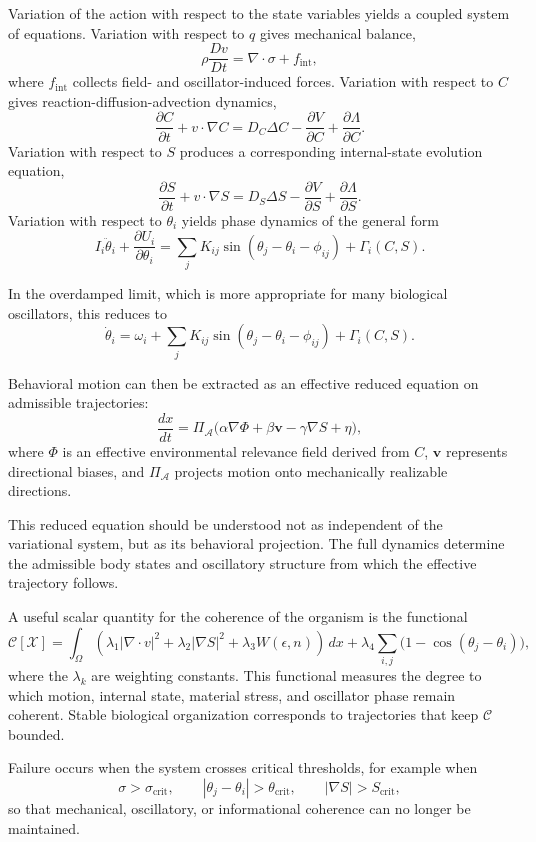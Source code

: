 \documentclass[11pt,oneside]{book}
\begin{document}
Variation of the action with respect to the state variables yields a coupled system of equations. Variation with respect to $q$ gives mechanical balance,
\[
\rho \frac{D v}{D t} = \nabla \cdot \sigma + f_{\mathrm{int}},
\]
where $f_{\mathrm{int}}$ collects field- and oscillator-induced forces. Variation with respect to $C$ gives reaction-diffusion-advection dynamics,
\[
\frac{\partial C}{\partial t}
+
v \cdot \nabla C
=
D_C \Delta C - \frac{\partial V}{\partial C} + \frac{\partial \Lambda}{\partial C}.
\]
Variation with respect to $S$ produces a corresponding internal-state evolution equation,
\[
\frac{\partial S}{\partial t}
+
v \cdot \nabla S
=
D_S \Delta S - \frac{\partial V}{\partial S} + \frac{\partial \Lambda}{\partial S}.
\]
Variation with respect to $\theta_i$ yields phase dynamics of the general form
\[
I_i \ddot{\theta}_i
+
\frac{\partial U_i}{\partial \theta_i}
=
\sum_j
K_{ij}\sin(\theta_j-\theta_i-\phi_{ij})
+
\Gamma_i(C,S).
\]

In the overdamped limit, which is more appropriate for many biological oscillators, this reduces to
\[
\dot{\theta}_i
=
\omega_i
+
\sum_j
K_{ij}\sin(\theta_j-\theta_i-\phi_{ij})
+
\Gamma_i(C,S).
\]

Behavioral motion can then be extracted as an effective reduced equation on admissible trajectories:
\[
\frac{dx}{dt}
=
\Pi_{\mathcal{A}}
\big(
\alpha \nabla \Phi
+
\beta \mathbf{v}
-
\gamma \nabla S
+
\eta
\big),
\]
where $\Phi$ is an effective environmental relevance field derived from $C$, $\mathbf{v}$ represents directional biases, and $\Pi_{\mathcal{A}}$ projects motion onto mechanically realizable directions.

This reduced equation should be understood not as independent of the variational system, but as its behavioral projection. The full dynamics determine the admissible body states and oscillatory structure from which the effective trajectory follows.

A useful scalar quantity for the coherence of the organism is the functional
\[
\mathcal{C}[\mathcal{X}]
=
\int_\Omega
\left(
\lambda_1 |\nabla \cdot v|^2
+
\lambda_2 |\nabla S|^2
+
\lambda_3 W(\epsilon,n)
\right)\,dx
+
\lambda_4
\sum_{i,j}
\big(1-\cos(\theta_j-\theta_i)\big),
\]
where the $\lambda_k$ are weighting constants. This functional measures the degree to which motion, internal state, material stress, and oscillator phase remain coherent. Stable biological organization corresponds to trajectories that keep $\mathcal{C}$ bounded.

Failure occurs when the system crosses critical thresholds, for example when
\[
\sigma > \sigma_{\mathrm{crit}},
\qquad
|\theta_j-\theta_i| > \theta_{\mathrm{crit}},
\qquad
|\nabla S| > S_{\mathrm{crit}},
\]
so that mechanical, oscillatory, or informational coherence can no longer be maintained.
\end{document}
